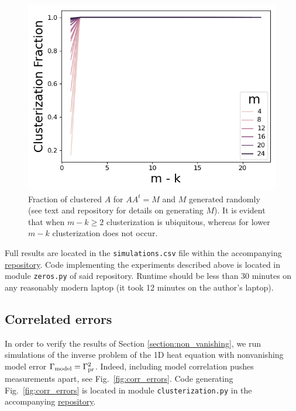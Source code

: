 \begin{figure}
    \centering
    \includegraphics[height=0.5\textwidth]{figs/simulations.png}
    \caption{Fraction of clustered $A$ for $AA^t = M$ and $M$
      generated randomly (see text and repository for details on
      generating $M$). It is evident that when $m-k \geq 2$ clusterization
      is ubiquitous, whereas for lower $m-k$ clusterization does not
      occur.}
  \label{fig:sim_AAt}
\end{figure}

Full results are located in the \texttt{simulations.csv} file within
the accompanying \href{https://github.com/yairdaon/OED}{repository}.
Code implementing the experiments described above is located in module
\texttt{zeros.py} of said repository. Runtime should be less than 30
minutes on any reasonably modern laptop (it took 12 minutes on the
author's laptop).





\subsection{Correlated errors}\label{subsec:corr_errors_sims}
In order to verify the results of Section \ref{section:non_vanishing},
we run simulations of the inverse problem of the 1D heat equation with
nonvanishing model error \(\Gamma_{\textup{model}} = \Gamma_{\textup{pr}}^2 \). Indeed, including
model correlation pushes measurements apart, see
Fig.~\ref{fig:corr_errors}. Code generating Fig.~\ref{fig:corr_errors}
is located in module \texttt{clusterization.py} in the accompanying
\href{https://github.com/yairdaon/OED}{repository}.

